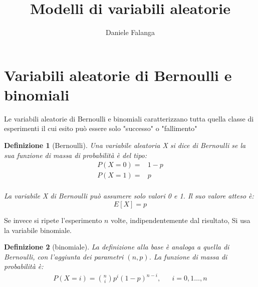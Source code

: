 \documentclass[12pt]{article}
\title{\textbf{Modelli di variabili aleatorie}}
\author{Daniele Falanga}
\date{}
\newtheorem{definition}{Definizione}[section]
\begin{document}
\maketitle

\section{Variabili aleatorie di Bernoulli e binomiali}
Le variabili aleatorie di Bernoulli e binomiali caratterizzano tutta quella classe
di esperimenti il cui esito può essere solo "successo" o "fallimento"

\begin{definition}[Bernoulli]
    Una variabile aleatoria X si dice di Bernoulli se la sua funzione di massa
    di probabilità è del tipo: 
    \begin{align*}
        P(X = 0) = & 1-p \\
        P(X=1) = &  p \\
    \end{align*}

    La variabile X di Bernoulli può assumere solo valori 0 e 1. 
    \newline
    Il suo valore atteso è:
    \[
    E[X] = p    
    \]
\end{definition}

Se invece si ripete l'esperimento \(n\) volte, indipendentemente dal risultato, 
Si usa la variabile binomiale.

\begin{definition}[binomiale]
    La definizione alla base è analoga a quella di Bernoulli, con l'aggiunta dei parametri
    \((n,p)\). 
    \newline
    La funzione di massa di probabilità è: 
    \begin{align*}
        P(X = i) = \binom{n}{i}p^i(1-p)^{n-i}, & & i = 0,1\dots,n
    \end{align*}
\end{definition}
\end{document}
